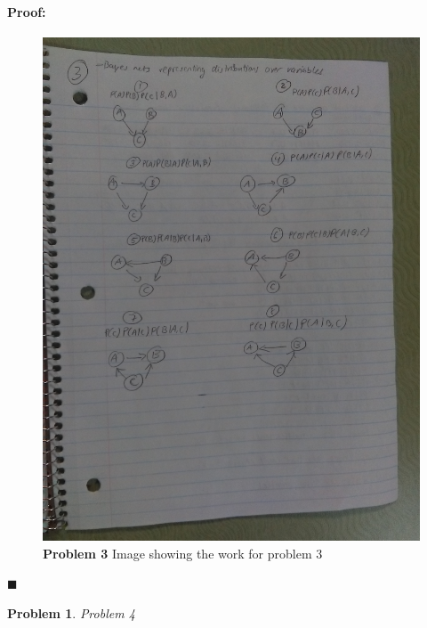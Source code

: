 \documentclass[12pt]{article}
\newenvironment{proof}{\paragraph{Proof: }}{\hfill$\blacksquare$}
\newtheorem{problem}{Problem}%
\begin{document}
\begin{proof}
\begin{figure}[!htbp]
\centering
\includegraphics[width = 13cm]{prob3_2_hw5.jpg}
\caption{\textbf{Problem 3} Image showing the work for problem 3}
\end{figure}

\end{proof}

\newpage
\newpage

\begin{problem}
\normalfont 
Problem 4
\end{problem}
\end{document}
